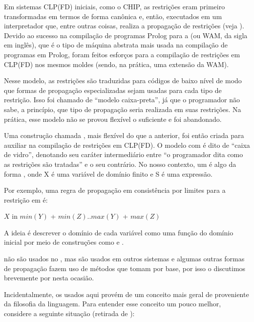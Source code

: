 Em sistemas CLP(FD) iniciais, como o CHIP, as restrições eram primeiro
transformadas em termos de forma canônica e, então, executados em um
interpretador que, entre outras coisas, realiza a propagação de
restrições (veja \cite{zhou}).  Devido ao sucesso na compilação de
programas Prolog para a  (ou WAM,
da sigla em inglês), que é o tipo de máquina abstrata mais usada na
compilação de programas em Prolog, foram feitos esforços para a
compilação de restrições em CLP(FD) nos mesmos moldes (sendo, na
prática, uma extensão da WAM).

Nesse modelo, as restrições são traduzidas para códigos de baixo nível
de modo que formas de propagação especializadas sejam usadas para cada
tipo de restrição. Isso foi chamado de ``modelo caixa-preta'', já que
o programador não sabe, a princípio, que tipo de propagação seria
realizada em suas restrições. Na prática, esse modelo não se provou
flexível o suficiente e foi abandonado.

Uma construção chamada , mais flexível do que a
anterior, foi então criada para auxiliar na compilação de restrições
em CLP(FD). O modelo com  é dito de ``caixa de
vidro'', denotando seu caráter intermediário entre ``o programador
dita como as restrições são tratadas'' e o seu contrário. No nosso
contexto, um  é algo da forma ,
onde X é uma variável de domínio finito e S é uma expressão.

Por exemplo, uma regra de propagação em consistência por limites para
a restrição   em  é:

$X$ in $min(Y)$ + $min(Z)..max(Y)$ + $max(Z)$

A ideia é descrever o domínio de cada variável como uma função do
domínio inicial por meio de construções como  e
.

 não são usados no \eclipse, mas são usados em
outros sistemas e algumas outras formas de propagação fazem uso de
métodos que tomam  por base, por isso o
discutimos brevemente por nesta ocasião.

Incidentalmente, os  usados aqui provém de um
conceito mais geral de  proveniente da filosofia
da linguagem.  Para entender esse conceito um pouco melhor, considere
a seguinte situação (retirada de \cite{raymond}):

